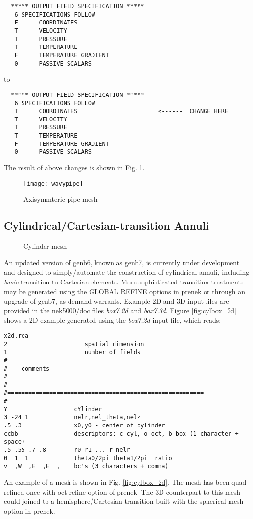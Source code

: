 \begin{verbatim}
  ***** OUTPUT FIELD SPECIFICATION *****
   6 SPECIFICATIONS FOLLOW
   F      COORDINATES
   T      VELOCITY
   T      PRESSURE
   T      TEMPERATURE
   F      TEMPERATURE GRADIENT
   0      PASSIVE SCALARS
\end{verbatim} 

\noindent
to

\begin{verbatim}
  ***** OUTPUT FIELD SPECIFICATION *****
   6 SPECIFICATIONS FOLLOW
   T      COORDINATES                       <------  CHANGE HERE
   T      VELOCITY
   T      PRESSURE
   T      TEMPERATURE
   F      TEMPERATURE GRADIENT
   0      PASSIVE SCALARS
\end{verbatim} 

\noindent
The result of above changes is shown in Fig. \ref{fig:wavypipe}.
\begin{figure}
\centering
\texttt{[image: wavypipe]}
\caption{Axisymmteric pipe mesh}
\label{fig:wavypipe}
\end{figure}

\subsection{Cylindrical/Cartesian-transition Annuli}
\begin{figure}
\centering
{}
\quad\quad\quad
{} 
\caption{Cylinder mesh}
\end{figure}


An updated version of genb6, known as genb7, is currently under development
and designed to simply/automate the construction of cylindrical annuli, 
including {\em basic} transition-to-Cartesian elements.   More sophisticated
transition treatments may be generated using the GLOBAL REFINE options in
prenek or through an upgrade of genb7, as demand warrants.
Example 2D and 3D input files are provided in the nek5000/doc files
{\em box7.2d} and {\em box7.3d}.
Figure \ref{fig:cylbox_2d} shows a 2D example generated using 
the {\em box7.2d} input file, which reads:
\begin{verbatim}
x2d.rea
2                      spatial dimension
1                      number of fields
#
#    comments
#
#
#========================================================
#
Y                   cYlinder
3 -24 1             nelr,nel_theta,nelz
.5 .3               x0,y0 - center of cylinder
ccbb                descriptors: c-cyl, o-oct, b-box (1 character + space)
.5 .55 .7 .8        r0 r1 ... r_nelr
0  1  1             theta0/2pi theta1/2pi  ratio 
v  ,W  ,E  ,E  ,    bc's (3 characters + comma)
\end{verbatim}

\noindent
An example of a mesh is shown in Fig. \ref{fig:cylbox_2d}.   The mesh has been quad-refined
once with oct-refine option of prenek. The 3D counterpart to this 
mesh could joined to a hemisphere/Cartesian transition built with
the spherical mesh option in prenek. 
